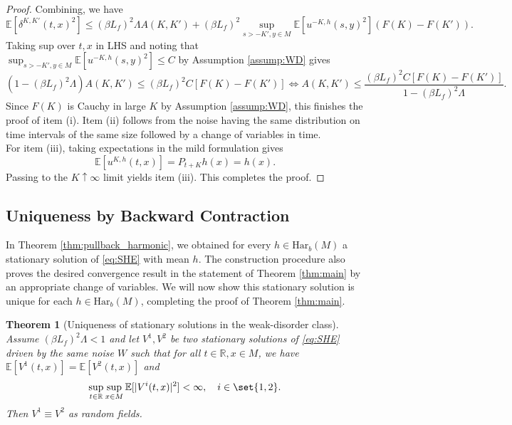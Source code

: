 \documentclass{article}
\newtheorem{theorem}{Theorem}
\numberwithin{theorem}{section}
\def\RR{\mathbb{R}} %
\def\EE{\mathbb{E}} %
\begin{document}
\begin{proof}
Combining, we have \[\EE[\delta^{K,K'}(t,x)^2]\leq (\beta L_f)^2\Lambda A(K,K') +(\beta L_f)^2\sup_{s>-K',y\in M}\EE[u^{-K,h}(s,y)^2] (F(K)-F(K')).\]
Taking sup over $t,x$ in LHS and noting that \(\sup_{s>-K',y\in M}\EE[u^{-K,h}(s,y)^2]\leq C\) by Assumption \ref{assump:WD} gives \[(1-(\beta L_f)^2\Lambda)A(K,K')\leq (\beta L_f)^2C[F(K)-F(K')]\iff A(K,K')\leq\frac{(\beta L_f)^2C[F(K)-F(K')]}{1-(\beta L_f)^2\Lambda}.\]
Since $F(K)$ is Cauchy in large $K$ by Assumption \ref{assump:WD}, this finishes the proof of item (i). Item (ii) follows from the noise having the same distribution on time intervals of the same size followed by a change of variables in time.\\
For item (iii), taking expectations in the mild formulation gives
\[
\EE[u^{K,h}(t,x)]
=
P_{t+K}h(x)=h(x).
\]
Passing to the $K\uparrow\infty$ limit yields item (iii). This completes the proof.
\end{proof}

\subsection{Uniqueness by Backward Contraction}
In Theorem \ref{thm:pullback_harmonic}, we obtained for every $h\in\mathrm{Har}_b(M)$ a stationary solution of \eqref{eq:SHE} with mean $h$. The construction procedure also proves the desired convergence result in the statement of Theorem \ref{thm:main} by an appropriate change of variables. We will now show this stationary solution is unique for each $h\in \mathrm{Har}_b(M)$, completing the proof of Theorem \ref{thm:main}.
\begin{theorem}[Uniqueness of stationary solutions in the weak-disorder class]
    Assume $(\beta L_f)^2\Lambda<1$ and let $V^1,V^2$ be two stationary solutions of \eqref{eq:SHE} driven by the same noise $W$ such that for all $t\in \RR,x\in M$, we have \(\EE[V^1(t,x)]=\EE[V^2(t,x)]\) and \[\sup_{t\in\RR}\sup_{x\in M}\EE[|V^i(t,x)|^2]<\infty,\quad i\in\set{1,2}.\]
    Then $V^1\equiv V^2$ as random fields.
\end{theorem}
\end{document}
